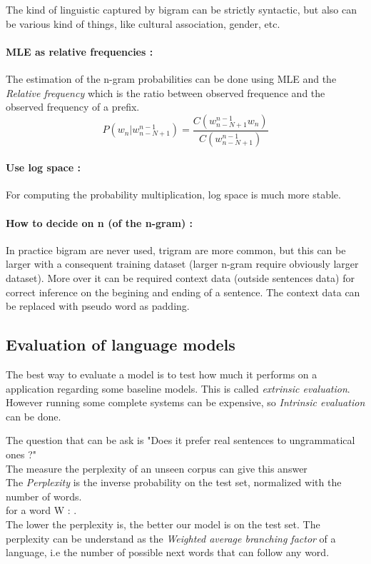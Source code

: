 				The kind of linguistic captured by bigram can be strictly syntactic, but also can be various kind of things, like cultural association, gender, etc. 

				\paragraph*{MLE as relative frequencies : } The estimation of the n-gram probabilities can be done using MLE and the \emph{Relative frequency} which is the ratio between observed frequence and the observed frequency of a prefix.
					\[
						P(w_n | w^{n-1}_{n-N+1}) = \frac{C(w^{n-1}_{n-N+1}w_n)}{C(w^{n-1}_{n-N+1})}
					\]
				\paragraph*{Use log space :} For computing the probability multiplication, log space is much more stable.
				\paragraph*{How to decide on n (of the n-gram) :} In practice bigram are never used, trigram are more common, but this can be larger with a consequent training dataset (larger n-gram require obviously larger dataset). More over it can be required context data (outside sentences data) for correct inference on the begining and ending of a sentence. The context data can be replaced with pseudo word as padding. 
			

		
		\subsection{Evaluation of language models}

			The best way to evaluate a model is to test how much it performs on a application regarding some baseline models. This is called \emph{extrinsic evaluation}. However running some complete systems can be expensive, so \emph{Intrinsic evaluation} can be done.

			The question that can be ask is "Does it prefer real sentences to ungrammatical ones ?"\\
			The measure the perplexity of an unseen corpus can give this answer\\
			The \emph{Perplexity} is the inverse probability on the test set, normalized with the number of words.\\
			for a word W : .\\
			The lower the perplexity is, the better our model is on the test set.
			The perplexity can be understand as the \emph{Weighted average branching factor} of a language, i.e the number of possible next words that can follow any word. 
